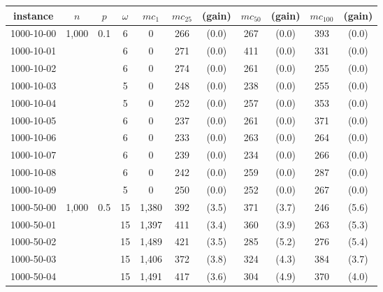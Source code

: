\documentclass{l4proj}
\begin{document}
\begin{table}
\begin{center}
\begin{scriptsize}
\begin{tabular}{|c|c|c|c|c|c c|c c|c c|} \hline 
instance & $n$ & $p$ & $\omega$ & $mc_{1}$  & $mc_{25}$ & (gain)  & $mc_{50}$ & (gain)   & $mc_{100}$  & (gain)   \\ \hline
1000-10-00  & 1,000 & 0.1 & 6     & 0          & 266      & (0.0)    & 267      & (0.0)    & 393      & (0.0)    \\
1000-10-01   &&& 6     & 0          & 271      & (0.0)    & 411      & (0.0)    & 331      & (0.0)    \\
1000-10-02   &&& 6     & 0          & 274      & (0.0)    & 261      & (0.0)    & 255      & (0.0)    \\
1000-10-03   &&& 5     & 0          & 248      & (0.0)    & 238      & (0.0)    & 255      & (0.0)    \\
1000-10-04   &&& 5     & 0          & 252      & (0.0)    & 257      & (0.0)    & 353      & (0.0)    \\
1000-10-05   &&& 6     & 0          & 237      & (0.0)    & 261      & (0.0)    & 371      & (0.0)    \\
1000-10-06   &&& 6     & 0          & 233      & (0.0)    & 263      & (0.0)    & 264      & (0.0)    \\
1000-10-07   &&& 6     & 0          & 239      & (0.0)    & 234      & (0.0)    & 266      & (0.0)    \\
1000-10-08   &&& 6     & 0          & 242      & (0.0)    & 259      & (0.0)    & 287      & (0.0)    \\
1000-10-09   &&& 5     & 0          & 250      & (0.0)    & 252      & (0.0)    & 267      & (0.0)    \\
1000-50-00  & 1,000 & 0.5 & 15    & 1,380       & 392      & (3.5)    & 371      & (3.7)    & 246      & (5.6)    \\
1000-50-01   &&& 15    & 1,397       & 411      & (3.4)    & 360      & (3.9)    & 263      & (5.3)    \\
1000-50-02   &&& 15    & 1,489       & 421      & (3.5)    & 285      & (5.2)    & 276      & (5.4)    \\
1000-50-03   &&& 15    & 1,406       & 372      & (3.8)    & 324      & (4.3)    & 384      & (3.7)    \\
1000-50-04   &&& 15    & 1,491       & 417      & (3.6)    & 304      & (4.9)    & 370      & (4.0)    \\

\end{tabular}
\end{scriptsize}
\end{center}
\end{table}
\end{document}
